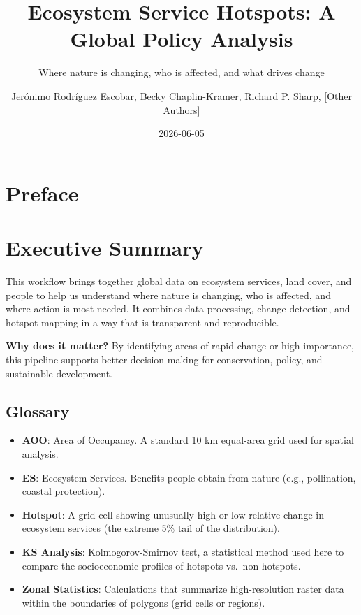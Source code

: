 \documentclass[
  letterpaper,
  DIV=11,
  numbers=noendperiod]{scrreprt}
\title{Ecosystem Service Hotspots: A Global Policy Analysis}
\subtitle{Where nature is changing, who is affected, and what drives
change}
\author{Jerónimo Rodríguez Escobar, Becky Chaplin-Kramer, Richard P. Sharp, [Other Authors]}
\date{2026-06-05}
\providecommand{\tightlist}{%
  \setlength{\itemsep}{0pt}\setlength{\parskip}{0pt}}
\renewcommand*\contentsname{Table of contents}
\newcommand\contentsname{Table of contents}
\begin{document}
\maketitle

\renewcommand*\contentsname{Table of contents}
{
\setcounter{tocdepth}{2}
\tableofcontents
}


\chapter*{Preface}\label{preface}



\chapter*{Executive Summary}\label{executive-summary}


This workflow brings together global data on ecosystem services, land
cover, and people to help us understand where nature is changing, who is
affected, and where action is most needed. It combines data processing,
change detection, and hotspot mapping in a way that is transparent and
reproducible.

\textbf{Why does it matter?} By identifying areas of rapid change or
high importance, this pipeline supports better decision-making for
conservation, policy, and sustainable development.

\section*{Glossary}\label{glossary}


\begin{itemize}
\tightlist
\item
  \textbf{AOO}: Area of Occupancy. A standard 10 km equal-area grid used
  for spatial analysis.
\item
  \textbf{ES}: Ecosystem Services. Benefits people obtain from nature
  (e.g., pollination, coastal protection).
\item
  \textbf{Hotspot}: A grid cell showing unusually high or low relative
  change in ecosystem services (the extreme 5\% tail of the
  distribution).
\item
  \textbf{KS Analysis}: Kolmogorov-Smirnov test, a statistical method
  used here to compare the socioeconomic profiles of hotspots
  vs.~non-hotspots.
\item
  \textbf{Zonal Statistics}: Calculations that summarize high-resolution
  raster data within the boundaries of polygons (grid cells or regions).
\end{itemize}
\end{document}
